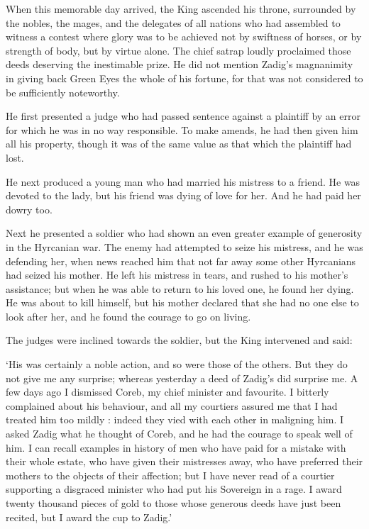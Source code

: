 \documentclass{article}
\begin{document}
\begin{center}
When this memorable day arrived, the King ascended his throne, surrounded by the 
nobles, the mages, and the delegates of all nations who had assembled to witness 
a contest where glory was to be achieved not by swiftness of horses, or by strength 
of body, but by virtue alone. The chief satrap loudly proclaimed those deeds deserving 
the inestimable prize. He did not mention Zadig's magnanimity in giving back Green 
Eyes the whole of his fortune, for that was not considered to be sufficiently noteworthy. 

He first presented a judge who had passed sentence against a plaintiff by an error 
for which he was in no way responsible. To make amends, he had then given him all 
his property, though it was of the same value as that which the plaintiff had lost. 

He next produced a young man who had married his mistress to a friend. He was devoted 
to the lady, but his friend was dying of love for her. And he had paid her dowry 
too. 

Next he presented a soldier who had shown an even greater example of generosity 
in the Hyrcanian war. The enemy had attempted to seize his mistress, and he was 
defending her, when news reached him that not far away some other Hyrcanians had 
seized his mother. He left his mistress in tears, and rushed to his mother's assistance; 
but when he was able to return to his loved one, he found her dying. He was about 
to kill himself, but his mother declared that she had no one else to look after 
her, and he found the courage to go on living. 

The judges were inclined towards the soldier, but the King intervened and said: 

`His was certainly a noble action, and so were those of the others. But they do 
not give me any surprise; whereas yesterday a deed of Zadig's did surprise me. 
A few days ago I dismissed Coreb, my chief minister and favourite. I bitterly complained 
about his behaviour, and all my courtiers assured me that I had treated him too 
mildly : indeed they vied with each other in maligning him. I asked Zadig what 
he thought of Coreb, and he had the courage to speak well of him. I can recall 
examples in history of men who have paid for a mistake with their whole estate, 
who have given their mistresses away, who have preferred their mothers to the objects 
of their affection; but I have never read of a courtier supporting a disgraced 
minister who had put his Sovereign in a rage. I award twenty thousand pieces of 
gold to those whose generous deeds have just been recited, but I award the cup 
to Zadig.' 


\end{center}
\end{document}
